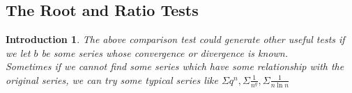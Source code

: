 \documentclass[12pt]{article}
\theoremstyle{oneline}
\theoremstyle{twoline}
\newtheorem{introduction}{Introduction}
\begin{document}
\subsection{The Root and Ratio Tests}
\begin{introduction}
  \hspace*{2em}
  The above comparison test could generate other useful tests if we let $b$ be some series whose convergence or divergence is known.\\
  \hspace*{2em} 
  Sometimes if we cannot find some series which have some relationship with the original series, we can try some typical series like $\Sigma q^n, \Sigma \frac1{n^q}, \Sigma \frac1{n\ln n} $
\end{introduction}
\end{document}
